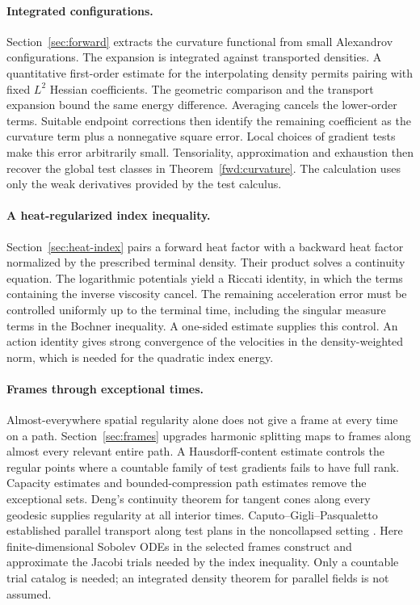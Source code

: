 \paragraph{Integrated configurations.}
Section~\ref{sec:forward} extracts the curvature functional from
small Alexandrov configurations. The expansion is integrated against
transported densities. A quantitative first-order estimate for the
interpolating density permits pairing with fixed \(L^2\) Hessian
coefficients. The geometric comparison and the transport expansion
bound the same energy difference. Averaging cancels the lower-order
terms. Suitable endpoint corrections then identify the remaining
coefficient as the curvature term plus a nonnegative square error.
Local choices of gradient tests make this error arbitrarily small.
Tensoriality, approximation and exhaustion then
recover the global test classes in Theorem~\ref{fwd:curvature}.
The calculation uses only the weak derivatives provided by the test calculus.

\paragraph{A heat-regularized index inequality.}
Section~\ref{sec:heat-index} pairs a forward heat factor with a backward
heat factor normalized by the prescribed terminal density.
Their product solves a continuity equation. The logarithmic
potentials yield a Riccati identity, in which the terms containing
the inverse viscosity cancel. The remaining acceleration error must
be controlled uniformly up to the terminal time, including the
singular measure terms in the Bochner inequality. A one-sided
estimate supplies this control. An action identity gives strong convergence of
the velocities in the density-weighted norm, which is needed for
the quadratic index energy.

\paragraph{Frames through exceptional times.}
Almost-everywhere spatial regularity alone does not give a frame at
every time on a path. Section~\ref{sec:frames} upgrades harmonic
splitting maps to frames along almost every relevant entire path. A Hausdorff-content
estimate controls the regular points where a countable family of
test gradients fails to have full rank. Capacity estimates and
bounded-compression path estimates remove the exceptional sets.
Deng's continuity theorem for tangent cones along every geodesic
\cite{Deng2020} supplies regularity at all interior times.
Caputo--Gigli--Pasqualetto established parallel transport along test
plans in the noncollapsed setting \cite{CGP2022}. Here finite-dimensional
Sobolev ODEs in the selected frames construct and approximate the
Jacobi trials needed by the index inequality. Only a countable trial catalog
is needed; an integrated density theorem for parallel fields is not
assumed.

